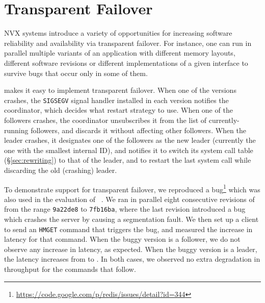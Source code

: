 \section{Transparent Failover}
\label{sec:failover}


NVX systems introduce a variety of opportunities for increasing
software reliability and availability via transparent failover.  For
instance, one can run in parallel multiple variants of an application with
different memory layouts, different software revisions or different
implementations of a given interface to survive bugs that occur 
only in some of them.   

\varan makes it easy to implement transparent failover.  When one of the
versions crashes, the \lstinline`SIGSEGV` signal handler installed in each
version notifies the coordinator, which decides what restart strategy
to use.  When one of the followers crashes, the coordinator unsubscribes it
from the list of currently-running followers, and discards it without
affecting other followers.  When the leader crashes, it designates one
of the followers as the new leader (currently the one with the
smallest internal ID), and notifies it to switch its system call table
(\S\ref{sec:rewriting}) to that of the leader, and to restart the last
system call while discarding the old (crashing) leader.

To demonstrate support for transparent failover, we reproduced a
\redis
bug\footnote{\url{https://code.google.com/p/redis/issues/detail?id=344}}
which was also used in the evaluation of \mx~\cite{mx}.  We ran in
parallel eight consecutive revisions of \redis from the range
\lstinline`9a22de8` to \lstinline`7fb16ba`, where the last revision
introduced a bug which crashes the server by causing a segmentation
fault. We then set up a client to send an \lstinline`HMGET` command
that triggers the bug, and measured the increase in latency for that
command.  When the buggy version is a follower, we do not observe any
increase in latency, as expected.  When the buggy version is a leader,
the latency increases from \redisnormallatency to
\redisfailoverlatency.  In both cases, we observed no extra
degradation in throughput for the commands that follow.


